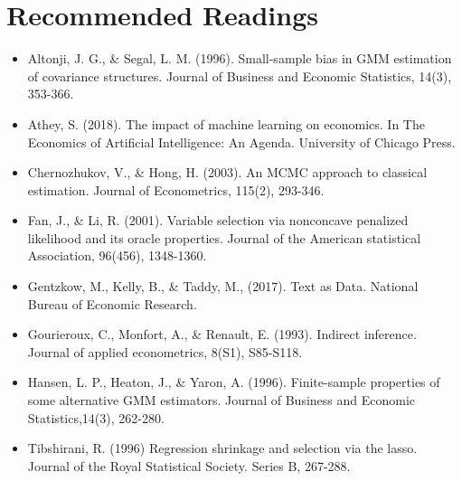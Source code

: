\documentclass[11pt]{article}
\begin{document}
\section*{Recommended Readings}
\begin{itemize}
\item Altonji, J. G., \& Segal, L. M. (1996). Small-sample bias in GMM estimation of covariance structures. Journal of Business and Economic Statistics, 14(3), 353-366. 
\item Athey, S. (2018). The impact of machine learning on economics. In The Economics of Artificial Intelligence: An Agenda. University of Chicago Press.
\item Chernozhukov, V., \& Hong, H. (2003). An MCMC approach to classical estimation. Journal of Econometrics, 115(2), 293-346. 
\item Fan, J., \& Li, R. (2001). Variable selection via nonconcave penalized likelihood and its oracle properties. Journal of the American statistical Association, 96(456), 1348-1360.
\item Gentzkow, M., Kelly, B., \& Taddy, M., (2017). Text as Data. National Bureau of
Economic Research.
\item Gourieroux, C., Monfort, A., \& Renault, E. (1993). Indirect inference. Journal of applied econometrics, 8(S1), S85-S118.
\item Hansen, L. P., Heaton, J., \& Yaron, A. (1996). Finite-sample properties of some alternative GMM estimators. Journal of Business and Economic Statistics,14(3), 262-280. 
\item Tibshirani, R. (1996) Regression shrinkage and selection via the lasso. Journal of the Royal Statistical Society. Series B, 267-288. 

\end{itemize}
\end{document}
